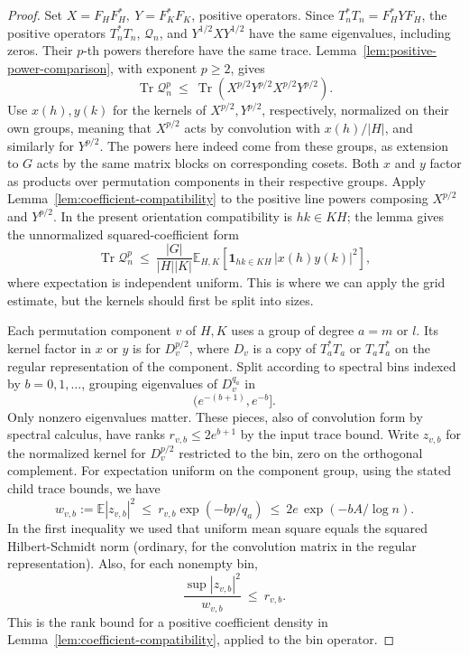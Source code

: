 \begin{proof}\label{tra:collision-series:weak-moment-proof}
\label{tra:collision-series:spectral-bin-recursion}
Set \(X=F_H F_H^*,\ Y=F_K^*F_K\), positive operators. Since \(T_n^*T_n=F_H^*YF_H\), the positive operators \(T_n^*T_n\), \(\mathcal Q_n\), and \(Y^{1/2}XY^{1/2}\) have the same eigenvalues, including zeros. Their \(p\)-th powers therefore have the same trace. Lemma~\ref{lem:positive-power-comparison}, with exponent $p\ge2$,
gives
\[
\operatorname{Tr} \mathcal Q_n^p \ \le\ \operatorname{Tr}\left(X^{p/2} Y^{p/2} X^{p/2} Y^{p/2}\right).
\]
Use \(x(h),y(k)\) for the kernels of \(X^{p/2}, Y^{p/2}\), respectively, normalized on their own groups, meaning that \(X^{p/2}\) acts by convolution with \(x(h)/|H|\), and similarly for \(Y^{p/2}\). The powers here indeed come from these groups, as extension to \(G\) acts by the same matrix blocks on corresponding cosets. Both \(x\) and \(y\) factor as products over permutation components in their respective groups. Apply Lemma~\ref{lem:coefficient-compatibility} to the positive
line powers composing $X^{p/2}$ and $Y^{p/2}$. In the present
orientation compatibility is $hk\in KH$; the lemma gives the
unnormalized squared-coefficient form
\begin{equation}
\operatorname{Tr} \mathcal Q_n^p \ \le\
\frac{|G|}{|H||K|}
\mathbb E_{H,K}\!\left[{\boldsymbol 1}_{hk\in KH}\, |x(h)y(k)|^2\right], \label{tra:collision-series:eq7}
\end{equation}
where expectation is independent uniform. This is where we can apply the grid estimate, but the kernels should first be split into sizes.

Each permutation component \(v\) of \(H,K\) uses a group of degree \(a=m\) or \(l\). Its kernel factor in \(x\) or \(y\) is for \(D_v^{p/2}\), where \(D_v\) is a copy of \(T_a^*T_a\) or \(T_a T_a^*\) on the regular representation of the component. Split according to spectral bins indexed by \(b=0,1,\ldots\), grouping eigenvalues of \(D_v^{q_a}\) in
\[
\big(e^{-(b+1)}, e^{-b}\big].
\]
Only nonzero eigenvalues matter. These pieces, also of convolution form by spectral calculus, have ranks \(r_{v,b}\le 2 e^{b+1}\) by the input trace bound. Write \(z_{v,b}\) for the normalized kernel for \(D_v^{p/2}\) restricted to the bin, zero on the orthogonal complement. For expectation uniform on the component group, using the stated child trace bounds, we have
\[
w_{v,b}:=\mathbb E |z_{v,b}|^2\ \le\
r_{v,b}\exp(-b p/q_a)\ \le\ 2 e\,\exp\left(-b A/\log n\right).
\]
In the first inequality we used that uniform mean square equals the squared Hilbert-Schmidt norm (ordinary, for the convolution matrix in the regular representation). Also, for each nonempty bin,
\[
\frac{\sup |z_{v,b}|^2}{w_{v,b}}\ \le\ r_{v,b}.
\]
This is the rank bound for a positive coefficient density in
Lemma~\ref{lem:coefficient-compatibility}, applied to the bin operator.


\end{proof}

